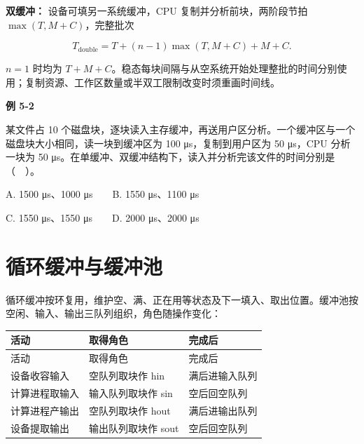 \textbf{双缓冲：} 设备可填另一系统缓冲，CPU 复制并分析前块，两阶段节拍 \(\max(T,M+C)\)，完整批次

\[T_{\mathrm{double}}=T+(n-1)\max(T,M+C)+M+C.\]

\(n=1\) 时均为 \(T+M+C\)。稳态每块间隔与从空系统开始处理整批的时间分别使用；复制资源、工作区数量或半双工限制改变时须重画时间线。

\par\medskip{}\noindent\hypertarget{OS05-E02}{}\label{OS05-E02}\textbf{例 5-2}\par\nobreak\smallskip

某文件占 10 个磁盘块，逐块读入主存缓冲，再送用户区分析。一个缓冲区与一个磁盘块大小相同，读一块到缓冲区为 100 μs，复制到用户区为 50 μs，CPU 分析一块为 50 μs。在单缓冲、双缓冲结构下，读入并分析完该文件的时间分别是（　）。

A. 1500 μs、1000 μs　　B. 1550 μs、1100 μs

C. 1550 μs、1550 μs　　D. 2000 μs、2000 μs

\section{循环缓冲与缓冲池}\label{OS05-buffer-pool}

循环缓冲按环复用，维护空、满、正在用等状态及下一填入、取出位置。缓冲池按空闲、输入、输出三队列组织，角色随操作变化：

\par\smallskip
{\fontsize{9.3}{12}\selectfont\setlength{\tabcolsep}{2.5pt}\setlength{\LTleft}{0pt}\setlength{\LTright}{0pt}
\begin{longtable}{@{}>{\raggedright\arraybackslash}p{}>{\raggedright\arraybackslash}p{}>{\raggedright\arraybackslash}p{}@{}}
\toprule
活动 & 取得角色 & 完成后 \\

\midrule\endfirsthead\toprule
活动 & 取得角色 & 完成后 \\

\midrule\endhead\bottomrule\endfoot
设备收容输入 & 空队列取块作 hin & 满后进输入队列 \\

计算进程取输入 & 输入队列取块作 sin & 空后回空队列 \\

计算进程产输出 & 空队列取块作 hout & 满后进输出队列 \\

设备提取输出 & 输出队列取块作 sout & 空后回空队列 \\

\end{longtable}}
\par\smallskip

